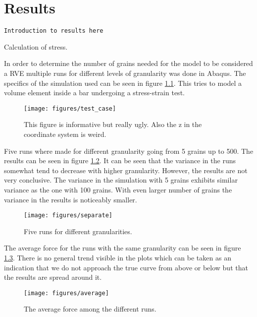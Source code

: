 \documentclass[convergence.tex]{subfiles}
\begin{document}
\chapter{Results}

\texttt{Introduction to results here}


Calculation of stress.




In order to determine the number of grains needed for the model to be considered a RVE multiple runs for different levels of granularity was done in Abaqus. The specifics of the simulation used can be seen in figure \ref{fig:test_case}. This tries to model a volume element inside a bar undergoing a stress-strain test. 

\begin{figure}[ht]
\centering
\texttt{[image: figures/test\_case]}
\caption{This figure is informative but really ugly. Also the z in the coordinate system is weird.}
\label{fig:test_case}
\end{figure}


Five runs where made for different granularity going from 5 grains up to 500. The results can be seen in figure \ref{fig:separate}. It can be seen that the variance in the runs somewhat tend to decrease with higher granularity. However, the results are not very conclusive. The variance in the simulation with 5 grains exhibits similar variance as the one with 100 grains. With even larger number of grains the variance in the results is noticeably smaller. 

\begin{figure}[ht]
\centering
\texttt{[image: figures/separate]}
\caption{Five runs for different granularities.}
\label{fig:separate}
\end{figure}


The average force for the runs with the same granularity can be seen in figure \ref{fig:average}. There is no general trend visible in the plots which can be taken as an indication that we do not approach the true curve from above or below but that the results are spread around it.


\begin{figure}[ht]
\centering
\texttt{[image: figures/average]}
\caption{The average force among the different runs.}
\label{fig:average}
\end{figure}
\end{document}
